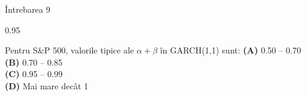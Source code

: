 \documentclass[9pt, aspectratio=169, t]{beamer}
\begin{document}
\begin{frame}{Întrebarea 9}
    \begin{cminipage}{0.95\textwidth}
    \begin{block}{Pentru S\&P 500, valorile tipice ale $\alpha + \beta$ în GARCH(1,1) sunt:}
        \textcolor{MainBlue}{\textbf{(A)}} 0.50 -- 0.70\\[3pt]
        \textcolor{MainBlue}{\textbf{(B)}} 0.70 -- 0.85\\[3pt]
        \textcolor{MainBlue}{\textbf{(C)}} 0.95 -- 0.99\\[3pt]
        \textcolor{MainBlue}{\textbf{(D)}} Mai mare decât 1
    \end{block}
    \end{cminipage}
\end{frame}
\end{document}
